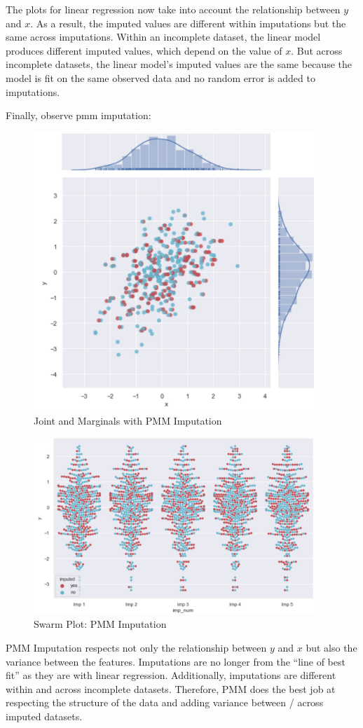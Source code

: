 \documentclass[12pt,oneside]{chicagocapstone}
\begin{document}
The plots for linear regression now take into account the relationship
between \(y\) and \(x\). As a result, the imputed values are different
within imputations but the same across imputations. Within an incomplete
dataset, the linear model produces different imputed values, which
depend on the value of \(x\). But across incomplete datasets, the linear
model's imputed values are the same because the model is fit on the same
observed data and no random error is added to imputations.

Finally, observe pmm imputation:
\begin{figure}

{\centering \includegraphics[width=400px]{figure/multi-pmm} 

}

\caption{Joint and Marginals with PMM Imputation}\label{fig:multi-pmm}
\end{figure}
\begin{figure}

{\centering \includegraphics[width=400px]{figure/swarm-pmm} 

}

\caption{Swarm Plot: PMM Imputation}\label{fig:swarm-pmm}
\end{figure}
PMM Imputation respects not only the relationship between \(y\) and
\(x\) but also the variance between the features. Imputations are no
longer from the ``line of best fit'' as they are with linear regression.
Additionally, imputations are different within and across incomplete
datasets. Therefore, PMM does the best job at respecting the structure
of the data and adding variance between / across imputed datasets.
\end{document}
